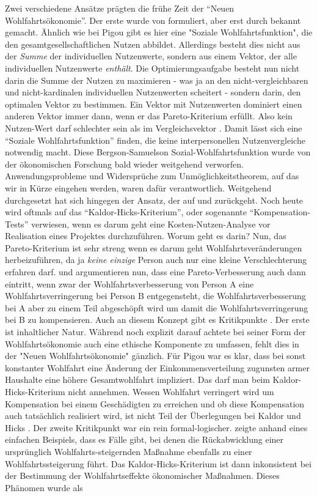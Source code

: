 Zwei verschiedene Ansätze prägten die frühe Zeit der "`Neuen Wohlfahrtsökonomie"'.  Der erste wurde von \textcite{Bergson1938} formuliert, aber erst durch \textcite{Samuelson1947} bekannt gemacht. Ähnlich wie bei Pigou gibt es hier eine "Soziale Wohlfahrtsfunktion", die den gesamtgesellschaftlichen Nutzen abbildet. Allerdings besteht dies nicht aus der \textit{Summe} der individuellen Nutzenwerte, sondern aus einem Vektor, der alle individuellen Nutzenwerte \textit{enthält}. Die Optimierungsaufgabe besteht nun nicht darin die Summe der Nutzen zu maximieren - was ja an den nicht-vergleichbaren und nicht-kardinalen individuellen Nutzenwerten scheitert - sondern darin, den optimalen Vektor zu bestimmen. Ein Vektor mit Nutzenwerten dominiert einen anderen Vektor immer dann, wenn er das Pareto-Kriterium erfüllt. Also kein Nutzen-Wert darf schlechter sein als im Vergleichsvektor \parencite[S. 9]{Suzumura2016}. Damit lässt sich eine "`Soziale Wohlfahrtsfunktion"' finden, die keine interpersonellen Nutzenvergleiche notwendig macht. Diese Bergson-Samuelson Sozial-Wohlfahrtsfunktion wurde von der ökonomischen Forschung bald wieder weitgehend verworfen. Anwendungsprobleme und Widersprüche zum Unmöglichkeitstheorem, auf das wir in Kürze eingehen werden, waren dafür verantwortlich. Weitgehend durchgesetzt hat sich hingegen der Ansatz, der auf \textcite{Kaldor1939} und \textcite{Hicks1940} zurückgeht. Noch heute wird oftmals auf das "`Kaldor-Hicks-Kriterium"', oder sogenannte "`Kompensation-Tests"' verwiesen, wenn es darum geht eine Kosten-Nutzen-Analyse vor Realisation eines Projektes durchzuführen. Worum geht es darin? Nun, das Pareto-Kriterium ist sehr streng wenn es darum geht Wohlfahrtsveränderungen herbeizuführen, da ja \textit{keine einzige} Person auch nur eine kleine Verschlechterung erfahren darf. \textcite{Hicks1940} und \textcite{Kaldor1939} argumentieren nun, dass eine Pareto-Verbesserung auch dann eintritt, wenn zwar der Wohlfahrtsverbesserung von Person A eine Wohlfahrtsverringerung bei Person B entgegensteht, die Wohlfahrtsverbesserung bei A aber zu einem Teil abgeschöpft wird um damit die Wohlfahrtsverringerung bei B zu kompensieren. Auch an diesem Konzept gibt es Kritikpunkte \parencite{Baumol1946}. Der erste ist inhaltlicher Natur. Während \textcite{Pigou1920} noch explizit darauf achtete bei seiner Form der Wohlfahrtsökonomie auch eine ethische Komponente zu umfassen, fehlt dies in der "Neuen Wohlfahrtsökonomie" gänzlich. Für Pigou war es klar, dass bei sonst konstanter Wohlfahrt eine Änderung der Einkommensverteilung zugunsten armer Haushalte eine höhere Gesamtwohlfahrt impliziert. Das darf man beim Kaldor-Hicks-Kriterium nicht annehmen. Wessen Wohlfahrt verringert wird um Kompensation bei einem Geschädigten zu erreichen und ob diese Kompensation auch tatsächlich realisiert wird, ist nicht Teil der Überlegungen bei Kaldor und Hicks \parencite[S. 11]{Suzumura2016}. Der zweite Kritikpunkt war ein rein formal-logischer. \textcite{Scitovsky1941} zeigte anhand eines einfachen Beispiels, dass es Fälle gibt, bei denen die Rückabwicklung einer ursprünglich Wohlfahrts-steigernden Maßnahme ebenfalls zu einer Wohlfahrtssteigerung führt. Das Kaldor-Hicks-Kriterium ist dann inkonsistent bei der Bestimmung der Wohlfahrtseffekte ökonomischer Maßnahmen. Dieses Phänomen wurde als 